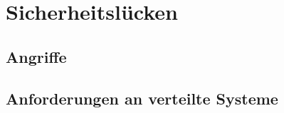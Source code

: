\chapter{Sicherheitslücken}\label{Sicherheitsluecken}
\section{Angriffe}
\section{Anforderungen an verteilte Systeme}